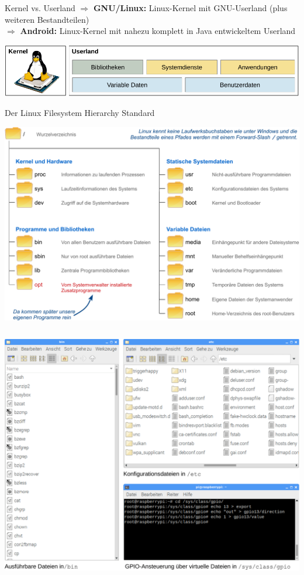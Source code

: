 {\begin{frame}{Kernel vs. Userland}
    \bigskip
    $\Rightarrow$ \textbf{GNU/Linux:} Linux-Kernel mit GNU-Userland (plus weiteren Bestandteilen) \\
    $\Rightarrow$ \textbf{Android:} Linux-Kernel mit nahezu komplett in Java entwickeltem Userland

    \vfill
    \includegraphics[width=\textwidth]{img/linux-bestandteile}
\end{frame}
}

{
\scriptsize

\begin{frame}[allowframebreaks]{Der Linux Filesystem Hierarchy Standard}
    \begin{center}
        \includegraphics[width=\textwidth]{img/fhs-verzeichnisse}
    \end{center}

    \framebreak

    \begin{columns}[T]
        \includegraphics[width=\textwidth]{img/fhs-beispiele}


\end{columns}
\end{frame}}

